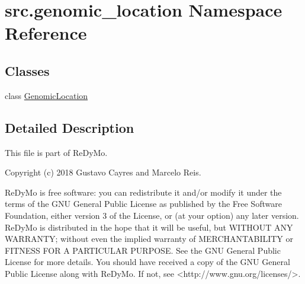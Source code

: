 \hypertarget{namespacesrc_1_1genomic__location}{}\section{src.\+genomic\+\_\+location Namespace Reference}
\label{namespacesrc_1_1genomic__location}
\subsection*{Classes}
\begin{DoxyCompactItemize}
\item 
class \mbox{\hyperlink{classsrc_1_1genomic__location_1_1GenomicLocation}{Genomic\+Location}}
\end{DoxyCompactItemize}


\subsection{Detailed Description}
\begin{DoxyVerb}This file is part of ReDyMo.

    Copyright (c) 2018  Gustavo Cayres and Marcelo Reis.

    ReDyMo is free software: you can redistribute it and/or modify it
    under the terms of the GNU General Public License as published by the
    Free Software Foundation, either version 3 of the License, or (at your
    option) any later version.
    ReDyMo is distributed in the hope that it will be useful, but WITHOUT
    ANY WARRANTY; without even the implied warranty of MERCHANTABILITY or
    FITNESS FOR A PARTICULAR PURPOSE. See the GNU General Public License
    for more details.
    You should have received a copy of the GNU General Public License along
    with ReDyMo. If not, see <http://www.gnu.org/licenses/>.\end{DoxyVerb}
 